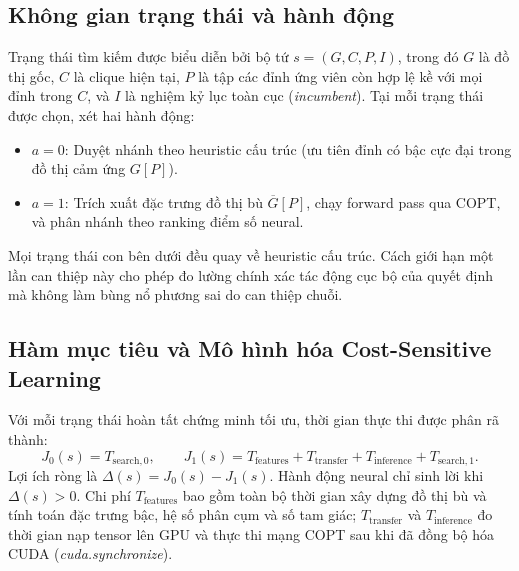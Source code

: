 \documentclass[11pt,a4paper]{article}
\begin{document}
\subsection{Không gian trạng thái và hành động}
Trạng thái tìm kiếm được biểu diễn bởi bộ tứ $s=(G,C,P,I)$, trong đó $G$ là đồ thị gốc, $C$ là clique hiện tại, $P$ là tập các đỉnh ứng viên còn hợp lệ kề với mọi đỉnh trong $C$, và $I$ là nghiệm kỷ lục toàn cục (\textit{incumbent}). Tại mỗi trạng thái được chọn, xét hai hành động:
\begin{itemize}[nosep]
\item $a=0$: Duyệt nhánh theo heuristic cấu trúc (ưu tiên đỉnh có bậc cực đại trong đồ thị cảm ứng $G[P]$).
\item $a=1$: Trích xuất đặc trưng đồ thị bù $\overline{G}[P]$, chạy forward pass qua COPT, và phân nhánh theo ranking điểm số neural.
\end{itemize}
Mọi trạng thái con bên dưới đều quay về heuristic cấu trúc. Cách giới hạn một lần can thiệp này cho phép đo lường chính xác tác động cục bộ của quyết định mà không làm bùng nổ phương sai do can thiệp chuỗi.

\subsection{Hàm mục tiêu và Mô hình hóa Cost-Sensitive Learning}
Với mỗi trạng thái hoàn tất chứng minh tối ưu, thời gian thực thi được phân rã thành:
\begin{equation}
J_0(s) = T_{\mathrm{search},0},\qquad
J_1(s) = T_{\mathrm{features}} + T_{\mathrm{transfer}} + T_{\mathrm{inference}} + T_{\mathrm{search},1}.
\end{equation}
Lợi ích ròng là $\Delta(s) = J_0(s) - J_1(s)$. Hành động neural chỉ sinh lời khi $\Delta(s) > 0$. Chi phí $T_{\mathrm{features}}$ bao gồm toàn bộ thời gian xây dựng đồ thị bù và tính toán đặc trưng bậc, hệ số phân cụm và số tam giác; $T_{\mathrm{transfer}}$ và $T_{\mathrm{inference}}$ đo thời gian nạp tensor lên GPU và thực thi mạng COPT sau khi đã đồng bộ hóa CUDA (\textit{cuda.synchronize}).
\end{document}
